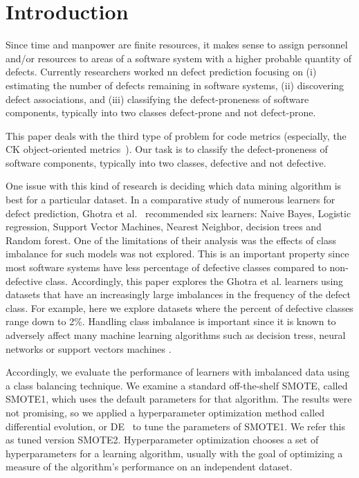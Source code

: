 \documentclass[sigconf,review, anonymous]{acmart}
\theoremstyle{break}
\theoremstyle{break}
\begin{document}



\section{Introduction}

Since time and manpower are finite resources, it
makes sense to assign personnel and/or resources to areas of
a software system with a higher probable quantity of defects. Currently researchers worked nn defect prediction focusing on (i) estimating the number of defects remaining in software systems, (ii) discovering defect associations, and (iii) classifying the defect-proneness of software components, typically into two classes defect-prone and not defect-prone. 

This paper deals with the third type of problem for code metrics (especially, the 
CK object-oriented metrics~\cite{chidamber1994metrics}).
Our task is to classify the defect-proneness of software components, typically into two classes, defective and not defective.

One issue with this kind of research is deciding
which data mining algorithm is best for a particular
dataset. In a comparative study of numerous
learners for defect prediction, Ghotra et al.~\cite{ghotra2015revisiting} recommended six learners: Naive Bayes, Logistic regression, Support Vector Machines, Nearest Neighbor, decision trees and Random forest. One of the limitations of their
analysis was the effects of class imbalance for such models was not explored.
This is an important property
since most software systems have less percentage of defective classes compared to non-defective class. Accordingly, this paper
explores the Ghotra et al. learners using datasets that have an increasingly large imbalances
in the frequency of the defect class. For
example, here we explore datasets where the percent
of defective classes
range down to 2\%. 
Handling class imbalance is important
since it is known to adversely affect
many machine learning algorithms such as decision tress,
neural networks or support vectors machines \cite{japkowicz2002class}. 

Accordingly,   we evaluate the performance of learners with imbalanced data using a class balancing technique.
We examine a standard off-the-shelf SMOTE, called SMOTE1, which uses
the default parameters for that algorithm. 
The results were not promising,
so we applied a hyperparameter optimization
method called differential evolution, or DE~\cite{storn1997differential} to tune the parameters of SMOTE1. 
We refer this as tuned version SMOTE2. Hyperparameter optimization chooses a set of hyperparameters for a learning algorithm, usually with the goal of optimizing a measure of the algorithm's performance on an independent dataset.
\end{document}

